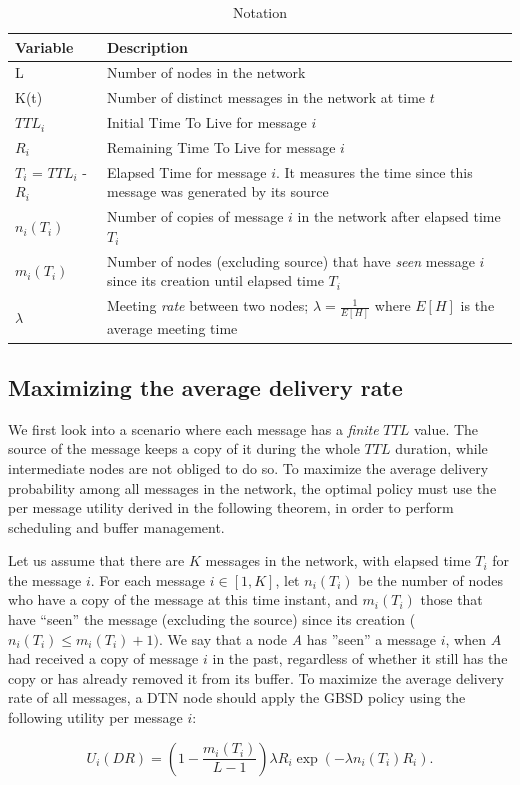 \begin{table}
\caption{Notation}
\centering
\label{table:notation}
\footnotesize
\begin{tabular}{|p{1.8cm}|p{5.7cm}|}
\hline
\bfseries Variable & \bfseries Description\\
\hline
L & Number of nodes in the network\\
\hline
K(t) & Number of distinct messages in the network at time $t$\\
\hline
$TTL_i$ & Initial Time To Live for message $i$\\
\hline
$R_i$ & Remaining Time To Live for message $i$\\
\hline
$T_i$ = $TTL_i$ - $R_i$ & Elapsed Time for message $i$. It measures the time since this message was generated by its source\\
\hline
$n_i(T_i)$ & Number of copies of message $i$ in the network after elapsed time $T_i$\\
\hline $m_i(T_i)$ & Number of nodes (excluding source) that
have \emph{seen} message $i$ since its creation until elapsed time $T_i$\\
\hline
$\lambda$ & Meeting \emph{rate} between two nodes; $\lambda = \frac{1}{E[H]}$ where $E[H]$ is the average meeting time\\
\hline
\end{tabular}
\end{table}
\normalsize

\subsection{Maximizing the average delivery rate}
\label{subsec:MaxAvgDeliveryRate}
We first look into a scenario where each message has a \emph{finite} $TTL$ value. The source of the message keeps a copy of it during the whole $TTL$ duration, while intermediate nodes are not obliged to do so. To maximize the average delivery probability among all messages in the network, the optimal policy must use the per message utility derived in the following theorem, in order to perform scheduling and buffer management.

\begin{theorem}\label{th:delivery-rate}
Let us assume that there are $K$ messages in the network, with
elapsed time $T_{i}$ for the message $i$. For each message $i \in [1,K]$, let $n_i(T_i)$ be the number of nodes who have a copy of the message at this time instant, and $m_i(T_i)$ those that have ``seen'' the message (excluding the source) since its creation ($n_i(T_i) \leqslant m_i(T_i)+1)$. We say that a node \emph{A} has ''seen'' a message $i$, when $A$ had received a copy of message $i$ in the past, regardless of whether it still has the copy or has already removed it from its buffer. To maximize the average delivery rate of all messages, a DTN node should apply the GBSD policy using the following utility per message $i$:

\begin{equation}\label{eq:GBSD-delivery-rate}
U_{i}(DR) = (1-\frac{m_i(T_i)}{L-1})\lambda R_i\exp(-\lambda n_i(T_i) R_i).
\end{equation}
\end{theorem}

